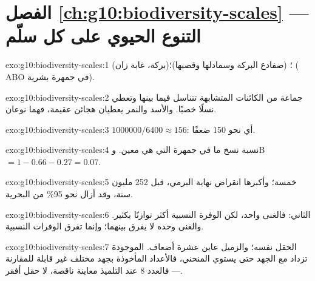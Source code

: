 \section*{الفصل \ref{ch:g10:biodiversity-scales} --- التنوع الحيوي على كل سلّم}

\begin{solution}{exo:g10:biodiversity-scales:1}
 (بركة، غابة زان)؛  (ضفادع البركة وسمادلها
وقصبها)؛  (  ABO في جمهرة بشرية).
\end{solution}

\begin{solution}{exo:g10:biodiversity-scales:2}
جماعة من الكائنات المتشابهة تتناسل فيما بينها وتعطي نسلًا خصبًا.
والأسد والنمر يعطيان هجائن عقيمة، فهما نوعان.
\end{solution}

\begin{solution}{exo:g10:biodiversity-scales:3}
$\num{1000000}/6400 \approx 156$: أي نحو 150 ضعفًا.
\end{solution}

\begin{solution}{exo:g10:biodiversity-scales:4}
نسبة نسخ  ما في جمهرة التي هي  معين. وB $= 1 - 0.66 - 0.27 = 0.07$.
\end{solution}

\begin{solution}{exo:g10:biodiversity-scales:5}
خمسة؛ وأكبرها انقراض نهاية البرمي، قبل 252 مليون سنة، وقد أزال نحو
95\% من  البحرية.
\end{solution}

\begin{solution}{exo:g10:biodiversity-scales:6}
الثاني: فالغنى واحد، لكن الوفرة النسبية أكثر توازنًا بكثير. والغنى
وحده لا يفرق بينهما؛ وإنما تفرق الوفرات النسبية.
\end{solution}

\begin{solution}{exo:g10:biodiversity-scales:7}
الحقل نفسه؛ والزميل عاين عشرة أضعاف.  الموجودة تزداد مع الجهد
حتى يستوي المنحني، فالأعداد المأخوذة بجهد مختلف غير قابلة للمقارنة ---
فالعدد 8 عند التلميذ معاينة ناقصة، لا حقل أفقر.
\end{solution}


